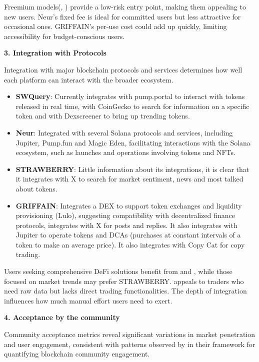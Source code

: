\documentclass[
]{article}
\providecommand{\tightlist}{%
  \setlength{\itemsep}{0pt}\setlength{\parskip}{0pt}}
\begin{document}
Freemium models(\cite{swquery2025}, \cite{strawberry2025}) provide a low-risk entry point,
making them appealing to new users. Neur's fixed fee is ideal for
committed users but less attractive for occasional ones. GRIFFAIN's
per-use cost could add up quickly, limiting accessibility for
budget-conscious users.

\textbf{3. Integration with Protocols}

Integration with major blockchain protocols and services determines how
well each platform can interact with the broader ecosystem.

\begin{itemize}
\tightlist
\item
  \textbf{SWQuery}: Currently integrates with pump.portal to interact
  with tokens released in real time, with CoinGecko to search for
  information on a specific token and with Dexscreener to bring up
  trending tokens.
\item
  \textbf{Neur}: Integrated with several Solana protocols and services,
  including Jupiter, Pump.fun and Magic Eden, facilitating interactions
  with the Solana ecosystem, such as launches and operations involving
  tokens and NFTs.
\item
  \textbf{STRAWBERRY}: Little information about its integrations, it is
  clear that it integrates with X to search for market sentiment, news
  and most talked about tokens.
\item
  \textbf{GRIFFAIN}: Integrates a DEX to support token exchanges and
  liquidity provisioning (Lulo), suggesting compatibility with
  decentralized finance protocols, integrates with X for posts and
  replies. It also integrates with Jupiter to operate tokens and DCAs
  (purchases at constant intervals of a token to make an average price).
  It also integrates with Copy Cat for copy trading.
\end{itemize}

Users seeking comprehensive DeFi solutions benefit from \cite{neur2025} and
\cite{griffain2025}, while those focused on market trends may prefer STRAWBERRY.
\cite{swquery2025} appeals to traders who need raw data but lacks direct trading
functionalities. The depth of integration influences how much manual
effort users need to exert.

\textbf{4. Acceptance by the community}

Community acceptance metrics reveal significant variations in market
penetration and user engagement, consistent with patterns observed by
\textcite{rodriguez2024} in their framework for quantifying
blockchain community engagement.
\end{document}
